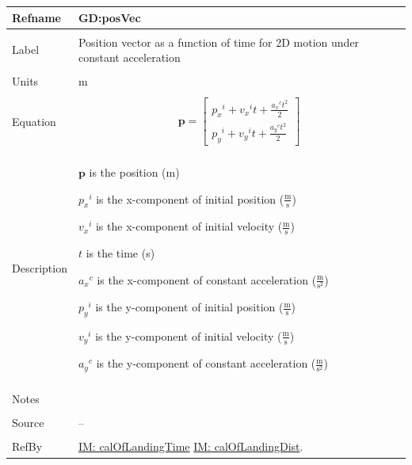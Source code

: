 \documentclass[12pt]{article}
\begin{document}
\noindent \begin{minipage}{\textwidth}
\begin{tabular}{p{} p{}}
\toprule \textbf{Refname} & \textbf{GD:posVec}
\label{GD:posVec}
\\ \midrule \\
Label & Position vector as a function of time for 2D motion under constant acceleration
\\ \midrule \\
Units & m
\\ \midrule \\
Equation & \begin{displaymath}
           \mathbf{p}=\begin{bmatrix}
{{p_{x}}^{i}}+{{v_{x}}^{i}} t+\frac{{{a_{x}}^{c}} t^{2}}{2}\\
{{p_{y}}^{i}}+{{v_{y}}^{i}} t+\frac{{{a_{y}}^{c}} t^{2}}{2}
\end{bmatrix}
           \end{displaymath}
\\ \midrule \\
Description & \begin{symbDescription}
              \item{$\mathbf{p}$ is the position (m)}
              \item{${{p_{x}}^{i}}$ is the x-component of initial position ($\frac{\text{m}}{\text{s}}$)}
              \item{${{v_{x}}^{i}}$ is the x-component of initial velocity ($\frac{\text{m}}{\text{s}}$)}
              \item{$t$ is the time (s)}
              \item{${{a_{x}}^{c}}$ is the x-component of constant acceleration ($\frac{\text{m}}{\text{s}^{2}}$)}
              \item{${{p_{y}}^{i}}$ is the y-component of initial position ($\frac{\text{m}}{\text{s}}$)}
              \item{${{v_{y}}^{i}}$ is the y-component of initial velocity ($\frac{\text{m}}{\text{s}}$)}
              \item{${{a_{y}}^{c}}$ is the y-component of constant acceleration ($\frac{\text{m}}{\text{s}^{2}}$)}
              \end{symbDescription}
\\ \midrule \\
Notes & 
\\ \midrule \\
Source & --
\\ \midrule \\
RefBy & \hyperref[IM:calOfLandingTime]{IM: calOfLandingTime} \hyperref[IM:calOfLandingDist]{IM: calOfLandingDist}.
\\ \bottomrule \end{tabular}
\end{minipage}
\end{document}

